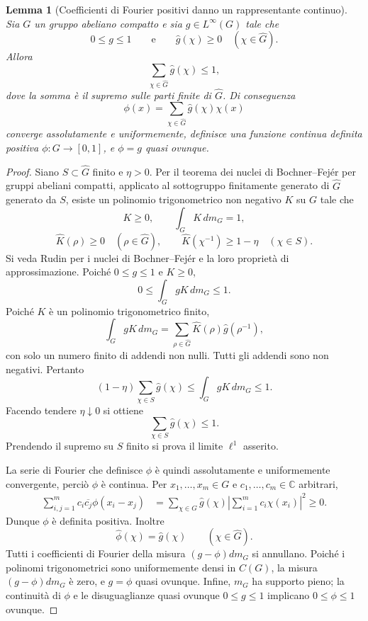 \documentclass[11pt]{article}
\numberwithin{equation}{section}
\newtheorem{lemma}[theorem]{Lemma}
\newcommand{\C}{\mathbb C}
\newcommand{\1}{\mathbf 1}
\begin{document}
\begin{lemma}[Coefficienti di Fourier positivi danno un rappresentante continuo]
\label{lem:linfty-continuous-pd}
Sia \(G\) un gruppo abeliano compatto e sia \(g\in L^\infty(G)\) tale che
\[
        0\le g\le1
        \qquad\text{e}\qquad
        \widehat g(\chi)\ge0
        \quad(\chi\in\widehat G).
\]
Allora
\[
        \sum_{\chi\in\widehat G}\widehat g(\chi)\le1,
\]
dove la somma è il supremo sulle parti finite di \(\widehat G\). Di conseguenza
\[
        \phi(x)=\sum_{\chi\in\widehat G}\widehat g(\chi)\chi(x)
\]
converge assolutamente e uniformemente, definisce una funzione continua definita positiva \(\phi:G\to[0,1]\), e \(\phi=g\) quasi ovunque.
\end{lemma}

\begin{proof}
Siano \(S\subset\widehat G\) finito e \(\eta>0\). Per il teorema dei nuclei di Bochner--Fejér per gruppi abeliani compatti, applicato al sottogruppo finitamente generato di \(\widehat G\) generato da \(S\), esiste un polinomio trigonometrico non negativo \(K\) su \(G\) tale che
\[
        K\ge0,
        \qquad
        \int_G K\,dm_G=1,
\]
\[
        \widehat K(\rho)\ge0
        \quad(\rho\in\widehat G),
        \qquad
        \widehat K(\chi^{-1})\ge1-\eta
        \quad(\chi\in S).
\]
Si veda Rudin \cite[Chapter 1, Sections 1.4--1.5]{Rudin} per i nuclei di Bochner--Fejér e la loro proprietà di approssimazione. Poiché \(0\le g\le1\) e \(K\ge0\),
\[
        0\le\int_G gK\,dm_G\le1.
\]
Poiché \(K\) è un polinomio trigonometrico finito,
\[
        \int_G gK\,dm_G
        =
        \sum_{\rho\in\widehat G}
        \widehat K(\rho)\widehat g(\rho^{-1}),
\]
con solo un numero finito di addendi non nulli. Tutti gli addendi sono non negativi. Pertanto
\[
        (1-\eta)\sum_{\chi\in S}\widehat g(\chi)
        \le
        \int_G gK\,dm_G
        \le1.
\]
Facendo tendere \(\eta\downarrow0\) si ottiene
\[
        \sum_{\chi\in S}\widehat g(\chi)\le1.
\]
Prendendo il supremo su \(S\) finito si prova il limite \(\ell^1\) asserito.

La serie di Fourier che definisce \(\phi\) è quindi assolutamente e uniformemente convergente, perciò \(\phi\) è continua. Per \(x_1,\ldots,x_m\in G\) e \(c_1,\ldots,c_m\in\C\) arbitrari,
\[
\begin{aligned}
        \sum_{i,j=1}^m c_i\overline{c_j}\phi(x_i-x_j)
        &=
        \sum_{\chi\in\widehat G}
        \widehat g(\chi)
        \left|
        \sum_{i=1}^m c_i\chi(x_i)
        \right|^2
        \ge0.
\end{aligned}
\]
Dunque \(\phi\) è definita positiva. Inoltre
\[
        \widehat\phi(\chi)=\widehat g(\chi)
        \qquad(\chi\in\widehat G).
\]
Tutti i coefficienti di Fourier della misura \((g-\phi)dm_G\) si annullano. Poiché i polinomi trigonometrici sono uniformemente densi in \(C(G)\), la misura \((g-\phi)dm_G\) è zero, e \(g=\phi\) quasi ovunque. Infine, \(m_G\) ha supporto pieno; la continuità di \(\phi\) e le disuguaglianze quasi ovunque \(0\le g\le1\) implicano \(0\le\phi\le1\) ovunque.
\end{proof}
\end{document}
